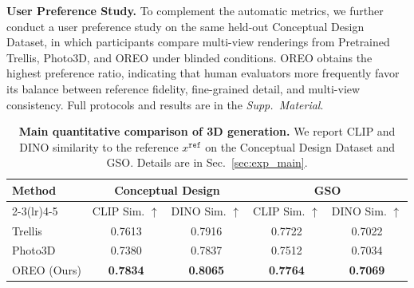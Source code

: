 \documentclass[runningheads]{llncs}
\begin{document}
\textbf{User Preference Study.}
To complement the automatic metrics, we further conduct a user preference study on the same held-out Conceptual Design Dataset, in which participants compare multi-view renderings from Pretrained Trellis, Photo3D, and OREO under blinded conditions.
OREO obtains the highest preference ratio, indicating that human evaluators more frequently favor its balance between reference fidelity, fine-grained detail, and multi-view consistency.
Full protocols and results are in the \emph{Supp.\ Material}.

\begin{table}[!tbp]
  \centering
  \caption{\textbf{Main quantitative comparison of 3D generation.} We report CLIP and DINO similarity to the reference $x^{\texttt{ref}}$ on the Conceptual Design Dataset and GSO. Details are in Sec.~\ref{sec:exp_main}.}
  \label{tab:main_results}
  \begin{tabular}{@{}lcccc@{}}
    \toprule
    \multirow{2}{*}{Method} & \multicolumn{2}{c}{Conceptual Design} & \multicolumn{2}{c}{GSO} \\
    \cmidrule(lr){2-3}\cmidrule(lr){4-5}
     & CLIP Sim. $\uparrow$ & DINO Sim. $\uparrow$ & CLIP Sim. $\uparrow$ & DINO Sim. $\uparrow$ \\
    \midrule
    Trellis & 0.7613 & 0.7916 & 0.7722 & 0.7022 \\
    Photo3D & 0.7380 & 0.7837 & 0.7512 & 0.7034 \\
    OREO (Ours) & \textbf{0.7834} & \textbf{0.8065} & \textbf{0.7764} & \textbf{0.7069} \\
    \bottomrule
  \end{tabular}
\end{table}
\end{document}
